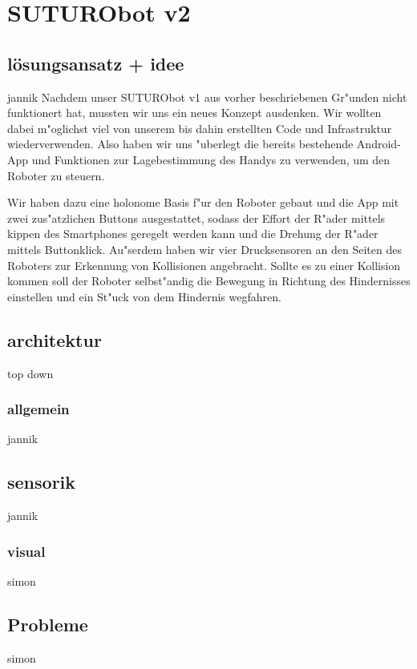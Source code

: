 \documentclass[8pt]{article}
\begin{document}
\section{SUTURObot v2}

\subsection{lösungsansatz + idee} jannik
Nachdem unser SUTURObot v1 aus vorher beschriebenen Gr"unden nicht funktionert hat, mussten wir uns ein neues Konzept ausdenken. Wir wollten dabei m"oglichst viel von unserem bis dahin erstellten Code und Infrastruktur wiederverwenden. Also haben wir uns "uberlegt die bereits bestehende Android-App und Funktionen zur Lagebestimmung des Handys zu verwenden, um den Roboter zu steuern.

Wir haben dazu eine holonome Basis f"ur den Roboter gebaut und die App mit zwei zus"atzlichen Buttons ausgestattet, sodass der Effort der R"ader mittels kippen des Smartphones geregelt werden kann und die Drehung der R"ader mittels Buttonklick. Au"serdem haben wir vier Drucksensoren an den Seiten des Roboters zur Erkennung von Kollisionen angebracht. Sollte es zu einer Kollision kommen soll der Roboter selbst"andig die Bewegung in Richtung des Hindernisses einstellen und ein St"uck von dem Hindernis wegfahren.

\subsection{architektur}
top down

\subsubsection{allgemein} jannik



\subsection{sensorik} jannik

\subsubsection{visual} simon

\subsection{Probleme} simon
\end{document}
